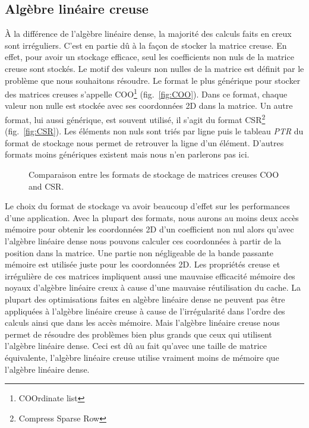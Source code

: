 \subsection{Algèbre linéaire creuse}
\`{A} la différence de l'algèbre linéaire dense, la majorité des calculs faits en creux sont irréguliers.
%
C'est en partie dû à la façon de stocker la matrice creuse.
%
En effet, pour avoir un stockage efficace, seul les coefficients non nuls de la matrice creuse sont stockés.
%
Le motif des valeurs non nulles de la matrice est définit par le problème que nous souhaitons résoudre.
%
Le format le plus générique pour stocker des matrices creuses s'appelle COO\footnote{COOrdinate list} (fig.~\ref{fig:COO}).
%
Dans ce format, chaque valeur non nulle est stockée avec ses coordonnées 2D dans la matrice.
%
Un autre format, lui aussi générique, est souvent utilisé, il s'agit du format CSR\footnote{Compress Sparse Row} (fig.~\ref{fig:CSR}).
%
Les éléments non nuls sont triés par ligne puis le tableau {\em PTR} du format de stockage nous permet de retrouver la ligne d'un élément.
%
D'autres formats moins génériques existent mais nous n'en parlerons pas ici.

\begin{figure}[!ht]
     \begin{center}
    \end{center}
    \caption{Comparaison entre les formats de stockage de matrices creuses COO and CSR.}
    \label{fig:matrix_storage}
\end{figure}

Le choix du format de stockage va avoir beaucoup d'effet sur les performances d'une application.
%
Avec la plupart des formats, nous aurons au moins deux accès mémoire pour obtenir les coordonnées 2D d'un coefficient non nul alors qu'avec l'algèbre linéaire dense nous pouvons calculer ces coordonnées à partir de la position dans la matrice.
%
Une partie non négligeable de la bande passante mémoire est utilisée juste pour les coordonnées 2D.
%
Les propriétés creuse et irrégulière de ces matrices impliquent aussi une mauvaise efficacité mémoire des noyaux d'algèbre linéaire creux à cause d'une mauvaise réutilisation du cache.
%
La plupart des optimisations faites en algèbre linéaire dense ne peuvent pas être appliquées à l'algèbre linéaire creuse à cause de l'irrégularité dans l'ordre des calculs ainsi que dans les accès mémoire.
%
Mais l'algèbre linéaire creuse nous permet de résoudre des problèmes bien plus grands que ceux qui utilisent l'algèbre linéaire dense.
%
Ceci est dû au fait qu'avec une taille de matrice équivalente, l'algèbre linéaire creuse utilise vraiment moins de mémoire que l'algèbre linéaire dense.


